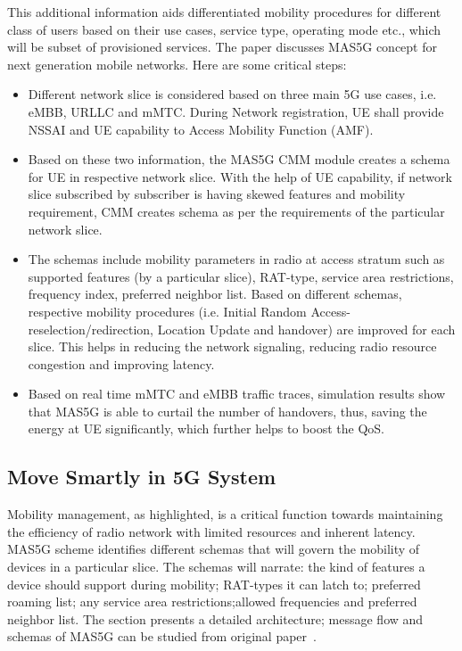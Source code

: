 \begin{multicols}{2}
This additional information aids differentiated mobility procedures for different class of users based on their use cases, service type, operating mode etc., which will be subset of provisioned services. The paper discusses MAS5G concept for next generation mobile networks. Here are some critical steps:
\begin{itemize}
\itemsep=2pt
\item Different network slice is considered based on three main 5G use cases, i.e. eMBB, URLLC and mMTC. During Network registration, UE shall provide NSSAI and UE capability to Access Mobility Function  (AMF).

\item Based on these two information, the MAS5G CMM  module creates a schema for UE in respective network  slice. With the help of UE capability, if network slice subscribed by subscriber is having skewed features and mobility requirement, CMM creates schema as per the requirements of the particular network slice. 

\item The schemas include mobility parameters in radio at access stratum such as supported features (by a particular slice), RAT-type, service area restrictions, frequency index, preferred neighbor list. Based on different schemas, respective mobility procedures (i.e. Initial Random Access-reselection/redirection, Location Update and handover) are improved for each slice. This helps in reducing the network signaling, reducing radio resource congestion and improving latency. 

\item Based on real time mMTC and eMBB traffic traces, simulation results show that MAS5G is able to curtail the number of handovers, thus, saving the energy at UE significantly, which further helps to boost the QoS.

\end{itemize}

\subsection{Move Smartly in 5G System} 

Mobility management, as highlighted, is a critical function towards maintaining the efficiency of radio network with limited resources and inherent latency. MAS5G scheme identifies different schemas that will govern the mobility of devices in a particular slice. The schemas will narrate: the kind of features a device should support during mobility; RAT-types it can latch to; preferred roaming list; any service area restrictions;\break allowed frequencies  and preferred neighbor list. The section presents a detailed architecture; message flow and schemas of MAS5G can be studied from original \hbox{paper \cite{art1-key01}.}


\end{multicols}
